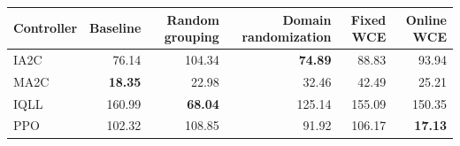 \begin{tabular}{lrrrrr}
\hline
Controller & Baseline & Random grouping & Domain randomization & Fixed WCE & Online WCE \\
\hline
IA2C & 76.14 & 104.34 & \textbf{74.89} & 88.83 & 93.94 \\
MA2C & \textbf{18.35} & 22.98 & 32.46 & 42.49 & 25.21 \\
IQLL & 160.99 & \textbf{68.04} & 125.14 & 155.09 & 150.35 \\
PPO & 102.32 & 108.85 & 91.92 & 106.17 & \textbf{17.13} \\
\hline
\end{tabular}
